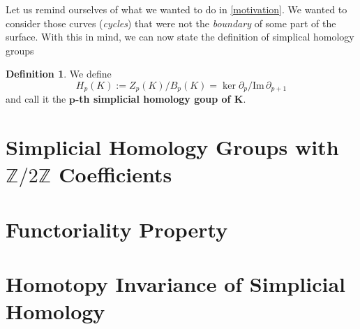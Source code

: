 \documentclass[draft]{scrartcl}
\theoremstyle{plain}
\theoremstyle{definition}
\newtheorem	{definition}[theorem]{Definition}
\theoremstyle{remark}
\newcommand{\SH}{Simplicial Homology}
\newcommand{\im}{\mathrm{Im}\,}
\begin{document}
Let us remind ourselves of what we wanted to do in \autoref{motivation}. We wanted to consider those curves (\emph{cycles}) that were not the \emph{boundary} of some part of the surface. With this in mind, we can now state the definition of simplical homology groups

\begin{definition}
	We define \[
	H_p(K):=Z_p(K)/B_p(K)=\ker \partial_p/\im \partial_{p+1}
	\]
	and call it the \textbf{$\mathbf{p}$-th simplicial homology goup of $\mathbf{K}$}.
\end{definition}

\section{\SH{} Groups with $\mathbb{Z}/2\mathbb{Z}$ Coefficients}
\section{Functoriality Property}
\section{Homotopy Invariance of \SH}

\printbibliography
\end{document}

